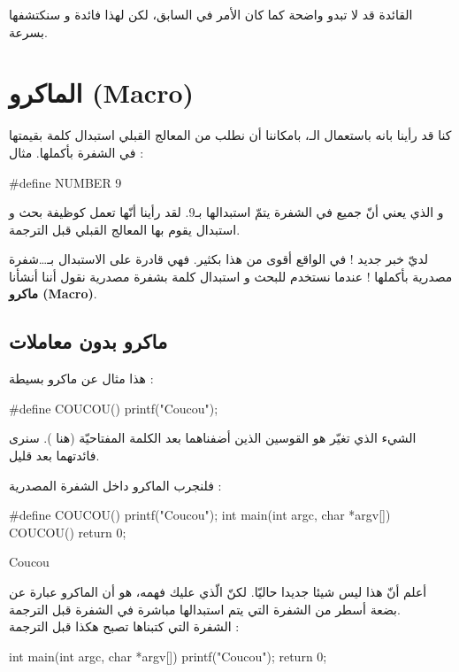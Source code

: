القائدة قد لا تبدو واضحة كما كان الأمر في السابق، لكن لهذا فائدة و سنكتشفها بسرعة.

\section{الماكرو (\textenglish{Macro})}

كنا قد رأينا بانه باستعمال الـ،
بامكاننا أن نطلب من المعالج القبلي استبدال كلمة بقيمتها في الشفرة بأكملها. مثال :

\begin{Csource}
#define NUMBER 9
\end{Csource}

و الذي يعني أنّ جميع
في الشفرة يتمّ استبدالها بـ9. لقد رأينا أنّها تعمل كوظيفة بحث و استبدال يقوم بها المعالج القبلي قبل الترجمة.

لديّ خبر جديد ! في الواقع
أقوى من هذا بكثير. فهي قادرة على الاستبدال بـ\dots شفرة مصدرية بأكملها ! عندما نستخدم
للبحث و استبدال كلمة بشفرة مصدرية نقول أننا أنشأنا
\textbf{ماكرو
(\textenglish{Macro})}.

\subsection{ماكرو بدون معاملات}

هذا مثال عن ماكرو بسيطة :

\begin{Csource}
#define COUCOU() printf("Coucou");
\end{Csource}

الشيء الذي تغيّر هو القوسين الذين أضفناهما بعد الكلمة المفتاحيّة (هنا
).
سنرى فائدتهما بعد قليل.

فلنجرب الماكرو داخل الشفرة المصدرية :

\begin{Csource}
#define COUCOU() printf("Coucou");
int main(int argc, char *argv[])
{
  COUCOU()
  return 0;
}
\end{Csource}

\begin{Console}
Coucou
\end{Console}

أعلم أنّ هذا ليس شيئا جديدا حاليّا. لكنّ الّذي عليك فهمه، هو أن الماكرو عبارة عن بضعة أسطر من الشفرة التي يتم استبدالها مباشرة في الشفرة قبل الترجمة.\\
الشفرة التي كتبناها تصبح هكذا قبل الترجمة :

\begin{Csource}
int main(int argc, char *argv[])
{
	printf("Coucou");
	return 0;
}
\end{Csource}

